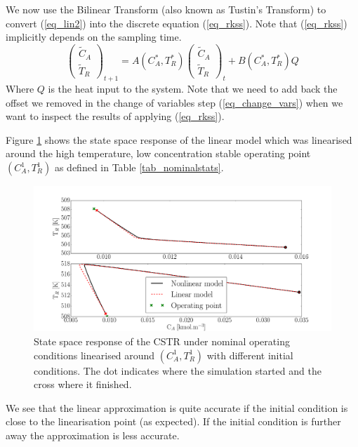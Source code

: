 \documentclass[../masters.tex]{subfiles}
\begin{document}
We now use the Bilinear Transform (also known as Tustin's Transform) to convert (\ref{eq_lin2}) into the discrete equation (\ref{eq_rkss}). Note that (\ref{eq_rkss}) implicitly depends on the sampling time.
\begin{equation}
\begin{pmatrix}
\tilde{C}_A \\ \tilde{T}_R
\end{pmatrix}_{t+1} = A(C_A^*, T_R^*) \begin{pmatrix}
\tilde{C}_A \\ \tilde{T}_R
\end{pmatrix}_{t} + B(C_A^*, T_R^*)Q 
\label{eq_rkss}
\end{equation}
Where $Q$ is the heat input to the system. Note that we need to add back the offset we removed in the change of variables step (\ref{eq_change_vars}) when we want to inspect the results of applying (\ref{eq_rkss}).
 
Figure \ref{fig_cstr_lin_1} shows the state space response of the linear model which was linearised around the high temperature, low concentration stable operating point $(C_A^1,T_R^1)$ as defined in Table \ref{tab_nominalstats}.
\begin{figure}[H] 
\centering
\includegraphics[scale=0.3]{cstr_lin_1.pdf}
\caption{State space response of the CSTR under nominal operating conditions linearised around $(C_A^1,T_R^1)$ with different initial conditions. The dot indicates where the simulation started and the cross where it finished.}
\label{fig_cstr_lin_1}
\end{figure}
We see that the linear approximation is quite accurate if the initial condition is close to the linearisation point (as expected). If the initial condition is further away the approximation is less accurate.
\end{document}
